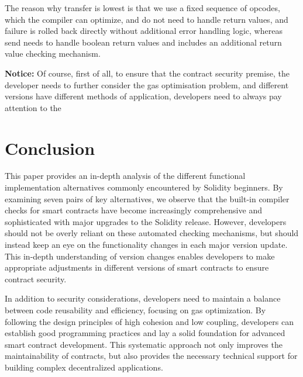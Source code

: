 \documentclass[conference]{IEEEtran}
\begin{document}
The reason why transfer is lowest is that we use a fixed sequence of opcodes, which the compiler can optimize, and do not need to handle return values, and failure is rolled back directly without additional error handling logic, whereas send needs to handle boolean return values and includes an additional return value checking mechanism.

\vspace{1em}
\textbf{Notice:} Of course, first of all, to ensure that the contract security premise, the developer needs to further consider the gas optimisation problem, and different versions have different methods of application, developers need to always pay attention to the

\vspace{3em}
\section{Conclusion}
This paper provides an in-depth analysis of the different functional implementation alternatives commonly encountered by Solidity beginners. By examining seven pairs of key alternatives, we observe that the built-in compiler checks for smart contracts have become increasingly comprehensive and sophisticated with major upgrades to the Solidity release. However, developers should not be overly reliant on these automated checking mechanisms, but should instead keep an eye on the functionality changes in each major version update. This in-depth understanding of version changes enables developers to make appropriate adjustments in different versions of smart contracts to ensure contract security.

In addition to security considerations, developers need to maintain a balance between code reusability and efficiency, focusing on gas optimization. By following the design principles of high cohesion and low coupling, developers can establish good programming practices and lay a solid foundation for advanced smart contract development. This systematic approach not only improves the maintainability of contracts, but also provides the necessary technical support for building complex decentralized applications.
\end{document}
